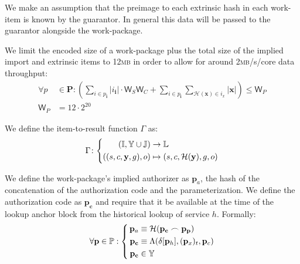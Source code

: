 We make an assumption that the preimage to each extrinsic hash in each work-item is known by the guarantor. In general this data will be passed to the guarantor alongside the work-package.

We limit the encoded size of a work-package plus the total size of the implied import and extrinsic items to 12\textsc{mb} in order to allow for around 2\textsc{mb}/s/core data throughput:
\begin{align}
  \label{eq:checkextractsize}
  \forall p &\in \mathbf{P}: \left(
  \sum_{i \in p_\mathbf{i}} |i_\mathbf{i}|\cdot\mathsf{W}_S\mathsf{W}_C + \sum_{i \in p_\mathbf{i}} \sum_{\mathcal{H}(\mathbf{x}) \in i_x} |\mathbf{x}|\right) \le \mathsf{W}_P \\
  \mathsf{W}_P &= 12\cdot2^{20}
\end{align}


We define the item-to-result function $\Gamma$ as:
\begin{equation}
  \Gamma\colon\left\{\begin{aligned}
    (\mathbb{I}, \Y \cup \mathbb{J}) &\to \mathbb{L}\\
    ((s, c, \mathbf{y}, g), o) &\mapsto (s, c, \mathcal{H}(\mathbf{y}), g, o)
  \end{aligned}\right.
\end{equation}

We define the work-package's implied authorizer as $\mathbf{p}_a$, the hash of the concatenation of the authorization code and the parameterization. We define the authorization code as $\mathbf{p}_\mathbf{c}$ and require that it be available at the time of the lookup anchor block from the historical lookup of service $h$. Formally:
\begin{equation}
  \forall \mathbf{p} \in \mathbb{P}: \left\{\,\begin{aligned}
    \mathbf{p}_a &\equiv \mathcal{H}(\mathbf{p}_\mathbf{c} \concat \mathbf{p}_\mathbf{p}) \\
    \mathbf{p}_\mathbf{c} &\equiv \Lambda(\delta[\mathbf{p}_h], (\mathbf{p}_x)_t, \mathbf{p}_c) \\
    \mathbf{p}_\mathbf{c} &\in \Y
  \end{aligned}\right.
\end{equation}

